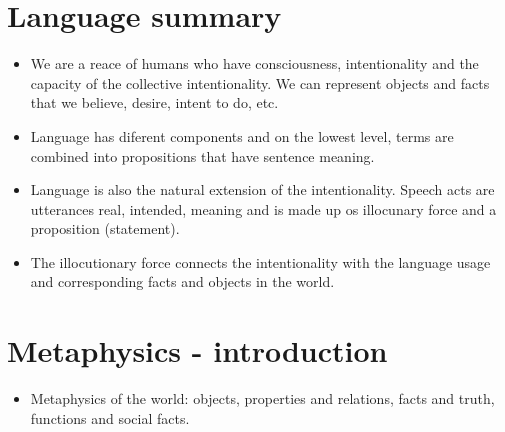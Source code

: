 \section{Language summary}
\begin{itemize}
    \item We are a reace of humans who have consciousness, intentionality and the capacity of the collective intentionality. We can represent objects and facts that we believe, desire, intent to do, etc. 
    \item  Language has diferent components and on the lowest level, terms are combined into propositions that have sentence meaning.
    \item Language is also the natural extension of the intentionality. Speech acts are utterances real, intended, meaning and is made up os illocunary force and a proposition (statement).
    \item The illocutionary force connects the intentionality with the language usage and corresponding facts and objects in the world.
\end{itemize}



\section{Metaphysics - introduction}
\begin{itemize}
    \item Metaphysics of the world: objects, properties and relations, facts and truth, functions and social facts.
\end{itemize}



